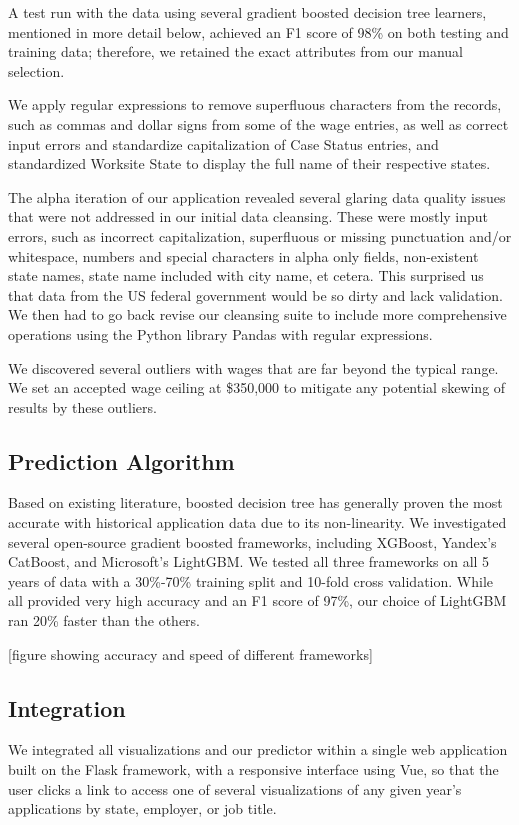 \documentclass[sigconf]{acmart}
\begin{document}
A test run with the data using several gradient boosted decision tree learners, 
mentioned in more detail below, achieved an F1 score of 98\% on both testing 
and training data; therefore, we retained the exact attributes from our manual selection. 


We apply regular expressions to remove superfluous characters from the records, 
such as commas and dollar signs from some of the wage entries, 
as well as correct input errors and standardize capitalization of Case Status entries, 
and standardized Worksite State to display the full name of their respective states.  


The alpha iteration of our application revealed several glaring data quality issues that were not addressed in our initial 
data cleansing. These were mostly input errors, such as incorrect capitalization, 
superfluous or missing punctuation and/or whitespace, 
numbers and special characters in alpha only fields, 
non-existent state names, state name included with city name, et cetera. 
This surprised us that data from the US federal government would be so dirty and lack validation. 
We then had to go back revise our cleansing suite to include more comprehensive operations using the 
Python library Pandas with regular expressions. 



We discovered several outliers with wages that are far beyond the typical range. 
We set an accepted wage ceiling at \$350,000 to mitigate any potential skewing of results 
by these outliers. 


\subsection{Prediction Algorithm}
Based on existing literature, boosted decision tree has generally proven 
the most accurate with historical application data due to its non-linearity. 
We investigated several open-source gradient boosted frameworks, including XGBoost, 
Yandex’s CatBoost, and Microsoft’s LightGBM. We tested all three frameworks on 
all 5 years of data with a 30\%-70\% training split and 10-fold cross validation. 
While all provided very high accuracy and an F1 score of 97\%, our choice of LightGBM ran 20\% faster than the others. 

[figure showing accuracy and speed of different frameworks]


\subsection{Integration}
We integrated all visualizations and our predictor within a single 
web application built on the Flask framework, with a responsive interface using Vue, so that 
the user clicks a link to access one of several visualizations of any given year's applications 
by state, employer, or job title. 
\end{document}
